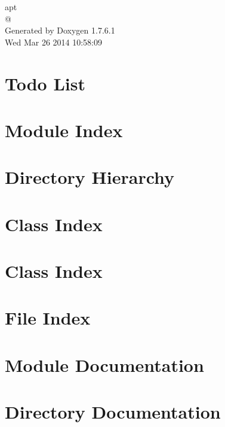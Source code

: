 \documentclass[a4paper]{book}
\begin{document}
\begin{titlepage}
\vspace*{7cm}
\begin{center}
{\Large apt \\[1ex]\large @ }\\
\vspace*{1cm}
{\large \-Generated by Doxygen 1.7.6.1}\\
\vspace*{0.5cm}
{\small Wed Mar 26 2014 10:58:09}\\
\end{center}
\end{titlepage}
\clearemptydoublepage
{}
\tableofcontents
\clearemptydoublepage
{}
\chapter{\-Todo \-List}
\label{todo}

\chapter{\-Module \-Index}

\chapter{\-Directory \-Hierarchy}

\chapter{\-Class \-Index}

\chapter{\-Class \-Index}

\chapter{\-File \-Index}

\chapter{\-Module \-Documentation}

\chapter{\-Directory \-Documentation}




\end{document}
